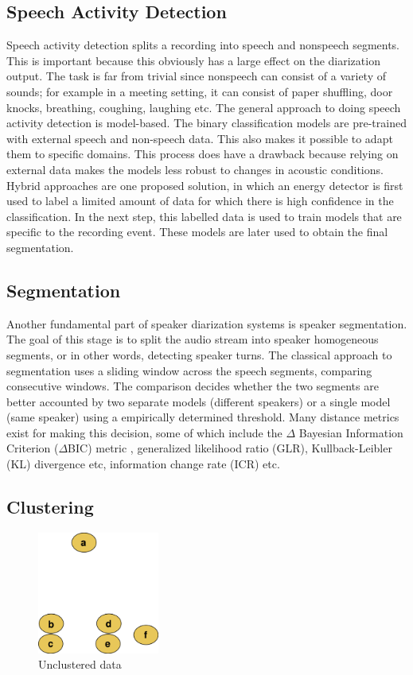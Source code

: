 	\subsection{Speech Activity Detection}
	Speech activity detection splits a recording into speech and nonspeech segments. This is important because this obviously has a large effect on the diarization output. The task is far from trivial since nonspeech can consist of a variety of sounds; for example in a meeting setting, it can consist of paper shuffling, door knocks, breathing, coughing, laughing etc.
	The general approach to doing speech activity detection is model-based. The binary classification models are pre-trained with external speech and non-speech data. This also makes it possible to adapt them to specific domains. This process does have a drawback because relying on external data makes the models less robust to changes in acoustic conditions. Hybrid approaches are one proposed solution, in which an energy detector is first used to label a limited amount of data for which there is high confidence in the classification. In the next step, this labelled data is used to train models that are specific to the recording event. These models are later used to obtain the final segmentation.
	
	\subsection{Segmentation}
	Another fundamental part of speaker diarization systems is speaker segmentation. The goal of this stage is to split the audio stream into speaker homogeneous segments, or in other words, detecting speaker turns. The classical approach to segmentation uses a sliding window across the speech segments, comparing consecutive windows. The comparison decides whether the two segments are better accounted by two separate models (different speakers) or a single model (same speaker) using a empirically determined threshold. Many distance metrics exist for making this decision, some of which include the $\Delta$ Bayesian Information Criterion ($\Delta$BIC) metric \cite{Chen1998SpeakerE}, generalized likelihood ratio (GLR), Kullback-Leibler (KL) divergence etc, information change rate (ICR) etc.
		
	\subsection{Clustering}

\begin{figure}[h]
\includegraphics[width=4cm]{figures/hac-1.png}
\centering
\caption{Unclustered data \cite{wiki:hac}}
\label{fig:hac1}
\end{figure}	
	
